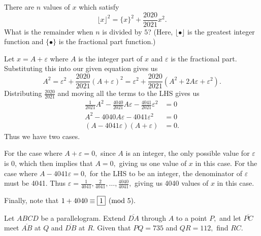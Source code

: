 \documentclass[letterpaper,oneside]{scrartcl}
\begin{document}
\begin{problem*}
  There are $n$ values of $x$ which satisfy
  \[\lfloor x \rfloor ^2 = \{x\}^2 + \dfrac{2020}{2021}x^2.\]
  What is the remainder when $n$ is divided by $5$? (Here, $\lfloor\bullet\rfloor$ is the greatest integer function and $\{\bullet\}$ is the fractional part function.)
\end{problem*}
\begin{soln}
  Let \(x=A+\varepsilon\) where \(A\) is the integer part of \(x\) and \(\varepsilon\) is the fractional part. Substituting this into our given equation gives us
  \[A^2 = \varepsilon^2 + \frac{2020}{2021}(A+\varepsilon)^2 = \varepsilon^2 + \frac{2020}{2021}(A^2+2A\varepsilon+\varepsilon^2).\]
  Distributing \(\tfrac{2020}{2021}\) and moving all the terms to the LHS gives us
  \begin{align*}
    \frac{1}{2021}A^2-\frac{4040}{2021}A\varepsilon - \frac{4041}{2021}\varepsilon^2 & = 0  \\
    A^2-4040A\varepsilon-4041\varepsilon^2                                           & = 0  \\
    (A-4041\varepsilon)(A+\varepsilon)                                               & = 0.
  \end{align*}
  Thus we have two cases.
  \begin{itemize}
    \ii  For the case where \(A+\varepsilon=0,\) since \(A\) is an integer, the only possible value for \(\varepsilon\) is 0, which then implies that \(A=0,\) giving us one value of \(x\) in this case.
    \ii For the case where \(A-4041\varepsilon =0,\) for the LHS to be an integer, the denominator of \(\varepsilon\) must be 4041. Thus \(\varepsilon = \tfrac{1}{4041},\tfrac{2}{4041},\dots,\tfrac{4040}{4041},\) giving us 4040 values of \(x\) in this case.
  \end{itemize}
  Finally, note that \(1+4040 \equiv \fbox{1} \pmod{5}.\)
\end{soln}
\newpage
\begin{problem*}
  [AIME 1998 \# 6]
  Let $ABCD$ be a parallelogram. Extend $\overline{DA}$ through $A$ to a point $P,$ and let $\overline{PC}$ meet $\overline{AB}$ at $Q$ and $\overline{DB}$ at $R.$ Given that $PQ=735$ and $QR=112,$ find $RC.$
\end{problem*}
\end{document}
